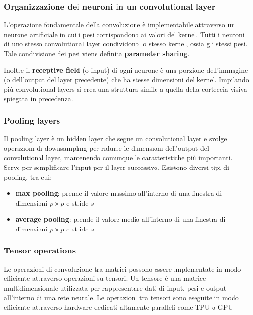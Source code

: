 \subsubsection*{Organizzazione dei neuroni in un convolutional layer}
L'operazione fondamentale della convoluzione è implementabile attraverso un neurone artificiale in cui i pesi corrispondono
ai valori del kernel. Tutti i neuroni di uno stesso convolutional layer condividono lo stesso kernel, ossia gli stessi pesi.
Tale condivisione dei pesi viene definita \textbf{parameter sharing}.

Inoltre il \textbf{receptive field} (o input) di ogni neurone è una porzione dell'immagine (o dell'output del layer precedente)
che ha stesse dimensioni del kernel. Impilando più convolutional layers si crea una struttura simile a quella della corteccia
visiva spiegata in precedenza.

\subsubsection*{Pooling layers}
Il pooling layer è un hidden layer che segue un convolutional layer e svolge operazioni di downsampling per ridurre le dimensioni
dell'output del convolutional layer, mantenendo comunque le caratteristiche più importanti. Serve per semplificare l'input per
il layer successivo. Esistono diversi tipi di pooling, tra cui:
\begin{itemize}
	\item \textbf{max pooling}: prende il valore massimo all'interno di una finestra di dimensioni \(p \times p\) e stride \(s\)
	\item \textbf{average pooling}: prende il valore medio all'interno di una finestra di dimensioni \(p \times p\) e stride \(s\)
\end{itemize}

\subsubsection*{Tensor operations}
Le operazioni di convoluzione tra matrici possono essere implementate in modo efficiente attraverso operazioni su tensori.
Un tensore è una matrice multidimensionale utilizzata per rappresentare dati di input, pesi e output all'interno di una rete
neurale. Le operazioni tra tensori sono eseguite in modo efficiente attraverso hardware dedicati altamente paralleli come TPU o GPU.

